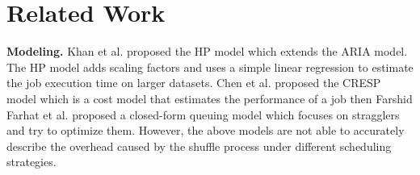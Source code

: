 \section{Related Work}\label{related}

{\color{black}
\textbf{Modeling.} 
Khan et al. \cite{khan2016hadoop} proposed the HP model which extends the ARIA model. The HP model adds scaling factors and uses a simple linear regression to estimate the job execution time on larger datasets.
Chen et al. \cite{chen2014cresp} proposed the CRESP model which is a cost model that estimates the performance of a job then 
Farshid Farhat et al.\cite{farhat2016stochastic} proposed a closed-form queuing model which focuses on stragglers and try to optimize them. 
However, the above models are not able to accurately describe the overhead caused by the shuffle process under different scheduling strategies. 

}
